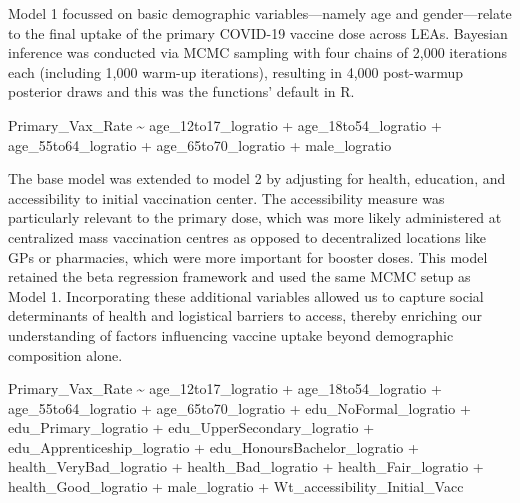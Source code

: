 \documentclass{article}
\begin{document}
Model 1 focussed on basic demographic variables---namely age and
gender---relate to the final uptake of the primary COVID-19 vaccine dose
across LEAs. Bayesian inference was conducted via MCMC sampling with
four chains of 2,000 iterations each (including 1,000 warm-up
iterations), resulting in 4,000 post-warmup posterior draws and this was
the functions' default in R.

Primary\_Vax\_Rate \textasciitilde{} age\_12to17\_logratio +
age\_18to54\_logratio + age\_55to64\_logratio + age\_65to70\_logratio +
male\_logratio

The base model was extended to model 2 by adjusting for health,
education, and accessibility to initial vaccination center. The
accessibility measure was particularly relevant to the primary dose,
which was more likely administered at centralized mass vaccination
centres as opposed to decentralized locations like GPs or pharmacies,
which were more important for booster doses. This model retained the
beta regression framework and used the same MCMC setup as Model 1.
Incorporating these additional variables allowed us to capture social
determinants of health and logistical barriers to access, thereby
enriching our understanding of factors influencing vaccine uptake beyond
demographic composition alone.

Primary\_Vax\_Rate \textasciitilde{} age\_12to17\_logratio +
age\_18to54\_logratio + age\_55to64\_logratio + age\_65to70\_logratio +
edu\_NoFormal\_logratio + edu\_Primary\_logratio +
edu\_UpperSecondary\_logratio + edu\_Apprenticeship\_logratio +
edu\_HonoursBachelor\_logratio + health\_VeryBad\_logratio +
health\_Bad\_logratio + health\_Fair\_logratio + health\_Good\_logratio
+ male\_logratio + Wt\_accessibility\_Initial\_Vacc
\end{document}
